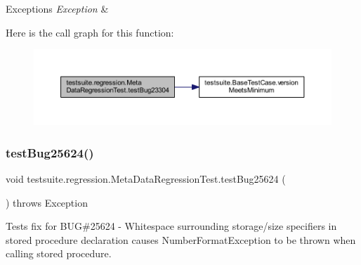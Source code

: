 \begin{DoxyExceptions}{Exceptions}
{\em Exception} & \\
\hline
\end{DoxyExceptions}
Here is the call graph for this function\+:
\nopagebreak
\begin{figure}[H]
\begin{center}
\leavevmode
\includegraphics[width=350pt]{classtestsuite_1_1regression_1_1_meta_data_regression_test_a5182df6da64a360d62191fc3be70fa75_cgraph}
\end{center}
\end{figure}
\mbox{\label{classtestsuite_1_1regression_1_1_meta_data_regression_test_a2a97b03d5a86fcd988e7648006a385a6}} 
\subsubsection{\texorpdfstring{test\+Bug25624()}{testBug25624()}}
{\footnotesize\ttfamily void testsuite.\+regression.\+Meta\+Data\+Regression\+Test.\+test\+Bug25624 (\begin{DoxyParamCaption}{ }\end{DoxyParamCaption}) throws Exception}

Tests fix for B\+UG\#25624 -\/ Whitespace surrounding storage/size specifiers in stored procedure declaration causes Number\+Format\+Exception to be thrown when calling stored procedure.



